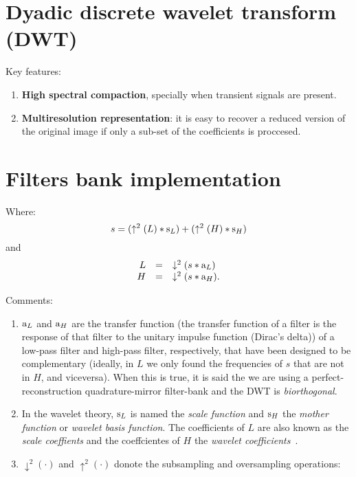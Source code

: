
\section{Dyadic discrete wavelet transform (DWT)}
Key features:

\begin{enumerate}
\tightlist
\item
  \textbf{High spectral compaction}, specially when transient signals
  are present.
\item
  \textbf{Multiresolution representation}: it is easy to recover a
  reduced version of the original image if only a sub-set of the
  coefficients is proccesed.
\end{enumerate}

\section{Filters bank implementation}
Where: \begin{equation}
  s = (\uparrow^2(L)*{\text s}_L) + (\uparrow^2(H)*{\text s}_H)
\end{equation} and \begin{equation}
  \begin{array}{rcl}
    L & = & \downarrow^2(s*{\text a}_L) \\
    H & = & \downarrow^2(s*{\text a}_H).
  \end{array}
\end{equation}

Comments:

\begin{enumerate}
\item
  \({\text a}_L\) and \({\text a}_H\) are the transfer function (the
  transfer function of a filter is the response of that filter to the
  unitary impulse function (Dirac's delta)) of a low-pass filter and
  high-pass filter, respectively, that have been designed to be
  complementary (ideally, in \(L\) we only found the frequencies of
  \(s\) that are not in \(H\), and viceversa). When this is true, it is
  said the we are using a perfect-reconstruction quadrature-mirror
  filter-bank and the DWT is \emph{biorthogonal}.
\item
  In the wavelet theory, \({\text s}_L\) is named the \emph{scale
  function} and \({\text s}_H\) the \emph{mother function} or
  \emph{wavelet basis function}. The coefficients of \(L\) are also
  known as the \emph{scale coeffients} and the coeffcientes of \(H\) the
  \emph{wavelet coefficients}~\cite{sovic2012signal}.
\item
  \(\downarrow^2(\cdot)\) and \(\uparrow^2(\cdot)\) donote the
  subsampling and oversampling operations:
\end{enumerate}

